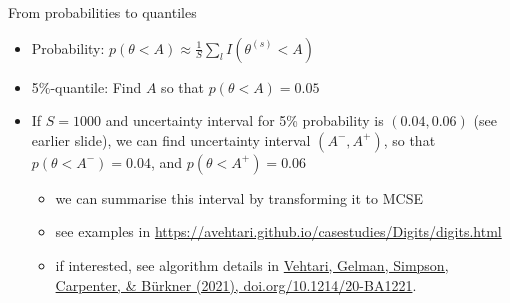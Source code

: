 \documentclass[finnish,english,t]{beamer}
\begin{document}
\begin{frame}{From probabilities to quantiles}

  \begin{itemize}
  \item Probability: $p(\theta < A)\approx \frac{1}{S}\sum_l I(\theta^{(s)} < A)$
  \item 5\%-quantile: Find $A$ so that $p(\theta < A)=0.05$
  \item<2-> If $S=1000$ and uncertainty interval for 5\% probability
    is $(0.04,0.06)$ (see earlier slide), we can find uncertainty
    interval $(A^-,A^+)$, so that $p(\theta < A^-)=0.04$, and
    $p(\theta < A^+)=0.06$
    \begin{itemize}
    \item<3-> we can summarise this interval by transforming it to MCSE
    \item<3-> see examples in \url{https://avehtari.github.io/casestudies/Digits/digits.html}
    \item<3-> {\color{gray}if interested, see algorithm details in \href{https://doi.org/10.1214/20-BA1221}{Vehtari, Gelman, Simpson, Carpenter, \& Bürkner (2021), doi.org/10.1214/20-BA1221}.}
    \end{itemize}
  \end{itemize}
  
\end{frame}
\end{document}

